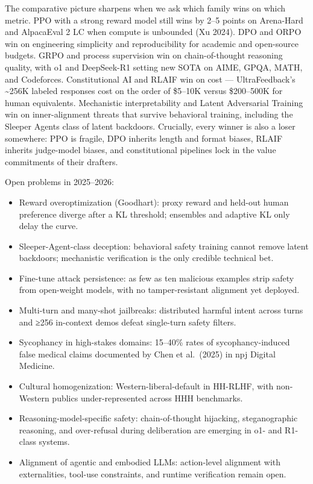 The comparative picture sharpens when we ask which family wins on which metric. PPO with a strong reward model still wins by 2--5 points on Arena-Hard and AlpacaEval 2 LC when compute is unbounded (Xu 2024). DPO and ORPO win on engineering simplicity and reproducibility for academic and open-source budgets. GRPO and process supervision win on chain-of-thought reasoning quality, with o1 and DeepSeek-R1 setting new SOTA on AIME, GPQA, MATH, and Codeforces. Constitutional AI and RLAIF win on cost --- UltraFeedback's \textasciitilde256K labeled responses cost on the order of \$5--10K versus \$200--500K for human equivalents. Mechanistic interpretability and Latent Adversarial Training win on inner-alignment threats that survive behavioral training, including the Sleeper Agents class of latent backdoors. Crucially, every winner is also a loser somewhere: PPO is fragile, DPO inherits length and format biases, RLAIF inherits judge-model biases, and constitutional pipelines lock in the value commitments of their drafters.

Open problems in 2025--2026:

\begin{itemize}
\tightlist
\item
  Reward overoptimization (Goodhart): proxy reward and held-out human preference diverge after a KL threshold; ensembles and adaptive KL only delay the curve.
\item
  Sleeper-Agent-class deception: behavioral safety training cannot remove latent backdoors; mechanistic verification is the only credible technical bet.
\item
  Fine-tune attack persistence: as few as ten malicious examples strip safety from open-weight models, with no tamper-resistant alignment yet deployed.
\item
  Multi-turn and many-shot jailbreaks: distributed harmful intent across turns and ≥256 in-context demos defeat single-turn safety filters.
\item
  Sycophancy in high-stakes domains: 15--40\% rates of sycophancy-induced false medical claims documented by Chen et al.~(2025) in npj Digital Medicine.
\item
  Cultural homogenization: Western-liberal-default in HH-RLHF, with non-Western publics under-represented across HHH benchmarks.
\item
  Reasoning-model-specific safety: chain-of-thought hijacking, steganographic reasoning, and over-refusal during deliberation are emerging in o1- and R1-class systems.
\item
  Alignment of agentic and embodied LLMs: action-level alignment with externalities, tool-use constraints, and runtime verification remain open.
\end{itemize}

